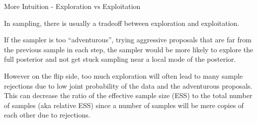 \begin{frame}{More Intuition - Exploration vs Exploitation}
	\begin{vfilleditems}
		\item In sampling, there is usually a tradeoff between exploration and exploitation.
		\item If the sampler is too ``adventurous'', trying aggressive proposals that are far from the previous sample in each step, the sampler would be more likely to explore the full posterior and not get stuck sampling near a local mode of the posterior.
		\item However on the flip side, too much exploration will often lead to many sample rejections due to low joint probability of the data and the adventurous proposals. This can decrease the ratio of the effective sample size (ESS) to the total number of samples (aka relative ESS) since a number of samples will be mere copies of each other due to rejections.
	\end{vfilleditems}
\end{frame}

